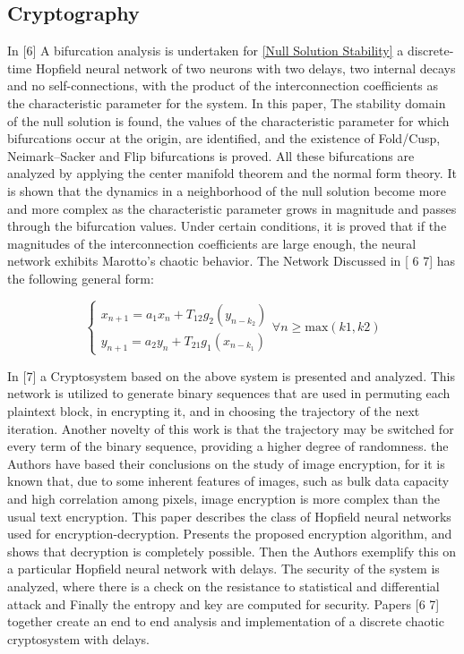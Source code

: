 \documentclass[12pt, letterpaper]{article}
\begin{document}
\subsection*{Cryptography}
In [6] A bifurcation analysis is undertaken for \ref{Null Solution Stability} a discrete-time Hopfield neural network of two neurons with two delays, two internal decays and no self-connections, with the product of the interconnection coefficients as the characteristic parameter for the system. In this paper, The stability domain of the null solution is found, the values of the characteristic parameter for which bifurcations occur at the origin, are identified, and the existence of Fold/Cusp, Neimark–Sacker and Flip bifurcations is proved. All these bifurcations are analyzed by applying the center manifold theorem and the normal form theory. It is shown that the dynamics in a neighborhood of the null solution become more and more complex as the characteristic parameter grows in magnitude and passes through the bifurcation values. Under certain conditions, it is proved that if the magnitudes of the interconnection coefficients are large enough, the neural network exhibits Marotto’s chaotic behavior. The Network Discussed in [ 6 7] has the following general form:

\begin{equation}\label{hopfield network}
    \begin{cases}
    x_{n+1} = a_{1}x_{n} + T_{12}g_{2}(y_{n - k_{2}})\\
    y_{n+1} = a_{2}y_{n} + T_{21}g_{1}(x_{n - k_{1}})
    \end{cases} \forall n \geq \text{max}(k1, k2)
\end{equation}


In [7] a Cryptosystem based on the above system is presented and analyzed. This network is utilized to generate binary sequences that are used in permuting each plaintext block, in encrypting it, and in choosing the trajectory of the next iteration. Another novelty of this work is that the trajectory may be switched for every term of the binary sequence, providing a higher degree of randomness. the Authors have based their conclusions on the study of image encryption, for it is known that, due to some inherent features of images, such as bulk data capacity and high correlation among pixels, image encryption is more complex than
the usual text encryption. This paper describes the class of Hopfield neural networks
used for encryption-decryption. Presents the proposed encryption algorithm, and shows
that decryption is completely possible. Then the Authors exemplify this on a particular Hopfield neural network with delays. The security of the system is analyzed, where there is a check on the resistance to statistical and differential attack and Finally the entropy and key are computed for
security. Papers [6 7] together create an end to end analysis and implementation of a discrete chaotic cryptosystem with delays.
\end{document}

